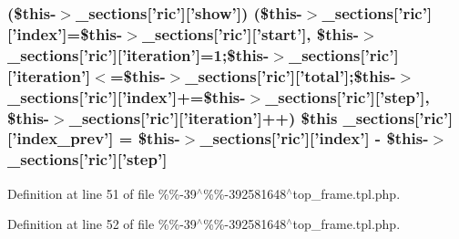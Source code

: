 {{{{{{{{{\subsubsection[{\-\_\-sections}]{ (\$this-\/$>${\bf \-\_\-sections}\mbox{[}'ric'\mbox{]}\mbox{[}'show'\mbox{]}) (\$this-\/$>${\bf \-\_\-sections}\mbox{[}'ric'\mbox{]}\mbox{[}'index'\mbox{]}=\$this-\/$>${\bf \-\_\-sections}\mbox{[}'ric'\mbox{]}\mbox{[}'start'\mbox{]}, \$this-\/$>${\bf \-\_\-sections}\mbox{[}'ric'\mbox{]}\mbox{[}'iteration'\mbox{]}=1;\$this-\/$>${\bf \-\_\-sections}\mbox{[}'ric'\mbox{]}\mbox{[}'iteration'\mbox{]}$<$=\$this-\/$>${\bf \-\_\-sections}\mbox{[}'ric'\mbox{]}\mbox{[}'total'\mbox{]};\$this-\/$>${\bf \-\_\-sections}\mbox{[}'ric'\mbox{]}\mbox{[}'index'\mbox{]}+=\$this-\/$>${\bf \-\_\-sections}\mbox{[}'ric'\mbox{]}\mbox{[}'step'\mbox{]}, \$this-\/$>${\bf \-\_\-sections}\mbox{[}'ric'\mbox{]}\mbox{[}'iteration'\mbox{]}++) \$this {\bf \-\_\-sections}\mbox{[}'ric'\mbox{]}\mbox{[}'index\-\_\-prev'\mbox{]} = \$this-\/$>${\bf \-\_\-sections}\mbox{[}'ric'\mbox{]}\mbox{[}'index'\mbox{]} -\/ \$this-\/$>${\bf \-\_\-sections}\mbox{[}'ric'\mbox{]}\mbox{[}'step'\mbox{]}}}\label{_06_06-39_05_06_06-392581648_05top__frame_8tpl_8php_a06fe8d896e7808cbce7af01f3c893273}


\-Definition at line 51 of file \%\%-\/39$^\wedge$\%\%-\/392581648$^\wedge$top\-\_\-frame.\-tpl.\-php.

\hypertarget{_06_06-39_05_06_06-392581648_05top__frame_8tpl_8php_ada3b1622f1dc0cfeae1d2e8ffb02484c}{
\index{\-\_\-sections@{\-\_\-sections}!%
\subsubsection[{\-\_\-sections}]{\setlength{\rightskip}{0pt plus 5cm}\$this {\bf \-\_\-sections}\mbox{[}'ric'\mbox{]}\mbox{[}'index\-\_\-next'\mbox{]} = \$this-\/$>${\bf \-\_\-sections}\mbox{[}'ric'\mbox{]}\mbox{[}'index'\mbox{]} + \$this-\/$>${\bf \-\_\-sections}\mbox{[}'ric'\mbox{]}\mbox{[}'step'\mbox{]}}}\label{_06_06-39_05_06_06-392581648_05top__frame_8tpl_8php_ada3b1622f1dc0cfeae1d2e8ffb02484c}


\-Definition at line 52 of file \%\%-\/39$^\wedge$\%\%-\/392581648$^\wedge$top\-\_\-frame.\-tpl.\-php.

}}}}}}}}}
